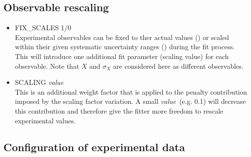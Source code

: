 \documentclass[a4paper,10pt]{article}
\def\tt{\ttfamily}
\def\rm{\rmfamily}
\begin{document}
\subsection{Observable rescaling}

\begin{itemize}
\item
\tt FIX\_SCALES 1/0\rm\\
Experimental observables can be fixed to ther actual values (\tt1\rm) or scaled within their given systematic uncertainty ranges (\tt0\rm)
during the fit process. This will introduce one additional fit parameter (scaling value) for each observable.
Note that $X$ and $\sigma_X$ are considered here as different observables.

\item
\tt SCALING \textit{value}\rm\\
This is an additional weight factor that is applied to the penalty contribution imposed by the scaling factor variation.
A small \tt\textit{value}\rm\ (e.g. 0.1) will decrease this contribution and therefore
give the fitter more freedom to rescale experimental values.
\end{itemize}

\subsection{Configuration of experimental data}
\end{document}
